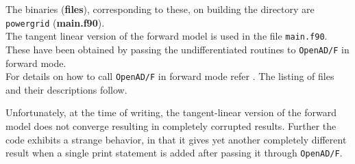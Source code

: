 \noindent The binaries (\textbf{files}), corresponding to these, on building the directory are \texttt{powergrid} (\textbf{{main.f90}}).\\

\noindent The tangent linear version of the forward model is used in the file  \texttt{main.f90}. These have been obtained by passing the undifferentiated routines to \texttt{OpenAD/F} in forward mode.\\

\noindent For details on how to call \texttt{OpenAD/F} in forward mode refer \cite{Utke_2014}. The listing of files and their descriptions follow.\\


\begin{TodoPar}
\noindent Unfortunately, at the time of writing, the tangent-linear version of the forward model does not converge resulting in completely corrupted results. Further the code exhibits a strange behavior, in that it gives yet another completely different result when a single print statement is added after passing it through \texttt{OpenAD/F}. 
\end{TodoPar}

